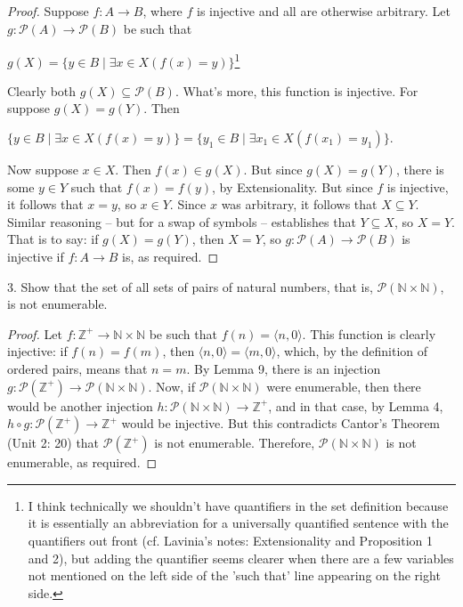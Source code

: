 \documentclass{article}
\begin{document}
\begin{proof} Suppose $f: A \rightarrow B$, where $f$ is injective and all are otherwise arbitrary. Let $g: \mathscr{P}(A) \rightarrow \mathscr{P}(B)$ be such that \begin{center} $g(X) = \{y \in B \mid \exists x \in X(f(x) = y)\}$\footnote[5]{I think technically we shouldn't have quantifiers in the set definition because it is essentially an abbreviation for a universally quantified sentence with the quantifiers out front (cf. Lavinia's notes: Extensionality and Proposition 1 and 2), but adding the quantifier seems clearer when there are a few variables not mentioned on the left side of the 'such that' line appearing on the right side.} \end{center} Clearly both $g(X) \subseteq \mathscr{P}(B)$. What's more, this function is injective. For suppose $g(X) = g(Y)$. Then \begin{center} $\{y \in B \mid \exists x \in X(f(x) = y)\} = \{y_1 \in B \mid \exists x_1 \in X(f(x_1) = y_1)\}.$ \end{center} Now suppose $x \in X$. Then $f(x) \in g(X)$. But since $g(X) = g(Y)$, there is some $y \in Y$ such that $f(x) = f(y)$, by Extensionality. But since $f$ is injective, it follows that $x = y$, so $x \in Y$. Since $x$ was arbitrary, it follows that $X \subseteq Y$. Similar reasoning – but for a swap of symbols – establishes that $Y \subseteq X$, so $X = Y$. That is to say: if $g(X) = g(Y)$, then $X =Y$, so $g: \mathscr{P}(A) \rightarrow \mathscr{P}(B)$ is injective if $f: A \rightarrow B$ is, as required. 
 \end{proof} 3. Show that the set of all sets of pairs of natural numbers, that is, $\mathscr{P}(\mathbb{N} \times \mathbb{N})$, is not enumerable. 
 \begin{proof} Let $f: \mathbb{Z^+} \rightarrow \mathbb{N} \times \mathbb{N}$ be such that $f(n) = \langle n, 0 \rangle$. This function is clearly injective: if $f(n) = f(m)$, then $\langle n, 0 \rangle = \langle m, 0 \rangle$, which, by the definition of ordered pairs, means that $n = m$. By Lemma 9, there is an injection $g: \mathscr{P}(\mathbb{Z^+}) \rightarrow \mathscr{P}(\mathbb{N} \times \mathbb{N})$. Now, if $\mathscr{P}(\mathbb{N} \times \mathbb{N})$ were enumerable, then there would be another injection $h: \mathscr{P}(\mathbb{N} \times \mathbb{N}) \rightarrow \mathbb{Z^+}$, and in that case, by Lemma 4, $h \circ g:  \mathscr{P}(\mathbb{Z^+}) \rightarrow \mathbb{Z^+}$ would be injective. But this contradicts Cantor's Theorem (Unit 2: 20) that $\mathscr{P}(\mathbb{Z^+})$ is not enumerable. Therefore, $\mathscr{P}(\mathbb{N} \times \mathbb{N})$ is not enumerable, as required.
 \end{proof}
\end{document}
